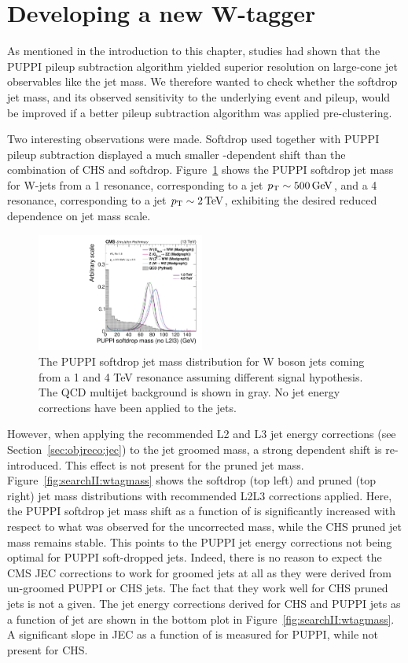 \clearpage
\section{Developing a new W-tagger}
\label{sec:searchII:puppisoftdrop}
As mentioned in the introduction to this chapter, studies had shown that the PUPPI pileup subtraction algorithm yielded superior resolution on large-cone jet observables like the jet mass. We therefore wanted to check whether the softdrop jet mass, and its observed sensitivity to the underlying event and pileup, would be improved if a better pileup subtraction algorithm was applied pre-clustering.\par
Two interesting observations were made. Softdrop used together with PUPPI pileup subtraction displayed a much smaller \PT-dependent shift than the combination of CHS and softdrop. Figure~\ref{fig:searchII:sdmass} shows the PUPPI softdrop jet mass for W-jets from a 1 \TeV resonance, corresponding to a jet $p_{\mathrm{T}}\sim 500 \,\text{Ge\hspace{-.08em}V}$, and a 4 \TeV resonance, corresponding to a jet $p_{\mathrm{T}}\sim 2 \,\text{Te\hspace{-.08em}V}$, exhibiting the desired reduced \PT dependence on jet mass scale. 
\begin{figure}[h!]
\centering
\includegraphics[width=0.49\textwidth]{figures/analysis/search2/AN-16-235/plots/gen_SoftdropMassUnCorr.pdf}
\caption{The PUPPI softdrop jet mass distribution for W boson jets coming from a 1 and 4 TeV resonance assuming different signal hypothesis. The QCD multijet background is shown in gray. No jet energy corrections have been applied to the jets.}
\label{fig:searchII:sdmass}
\end{figure}
However, when applying the recommended L2 and L3 jet energy corrections (see Section~\ref{sec:objreco:jec}) to the jet groomed mass, a strong \PT dependent shift is re-introduced. This effect is not present for the pruned jet mass. Figure~\ref{fig:searchII:wtagmass} shows the softdrop (top left) and pruned (top right) jet mass distributions with recommended L2L3 corrections applied. Here, the PUPPI softdrop jet mass shift as a function of \PT is significantly increased with respect to what was observed for the uncorrected mass, while the CHS pruned jet mass remains stable. This points to the PUPPI jet energy corrections not being optimal for PUPPI soft-dropped jets. Indeed, there is no reason to expect the CMS JEC corrections to work for groomed jets at all as they were derived from un-groomed PUPPI or CHS jets. The fact that they work well for CHS pruned jets is not a given. The jet energy corrections derived for CHS and PUPPI jets as a function of jet \PT are shown in the bottom plot in Figure~\ref{fig:searchII:wtagmass}. A significant slope in JEC as a function of \PT is measured for PUPPI, while not present for CHS.
